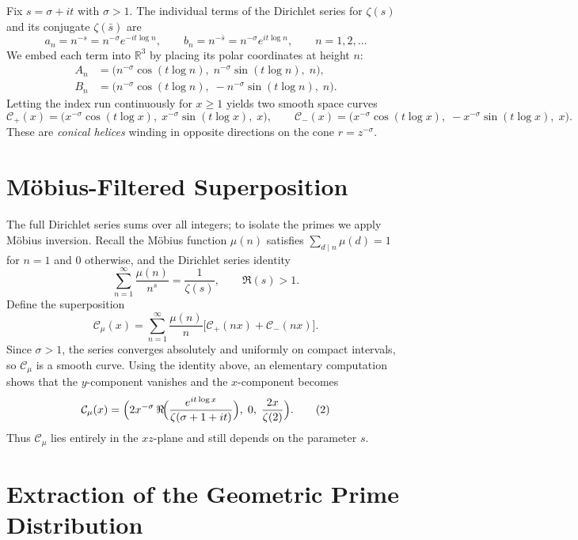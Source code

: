 \documentclass[12pt,a4paper,oneside]{book}
\newcommand{\R}{\mathbb{R}}
\begin{document}
Fix \(s=\sigma+it\) with \(\sigma>1\).  The individual terms of the Dirichlet series for \(\zeta(s)\) and its conjugate \(\zeta(\bar s)\) are
\[
a_n = n^{-s} = n^{-\sigma} e^{-i t \log n},\qquad
b_n = n^{-\bar s} = n^{-\sigma} e^{i t \log n},\qquad n=1,2,\dots
\]
We embed each term into \(\R^3\) by placing its polar coordinates at height \(n\):
\begin{align*}
A_n &= \bigl( n^{-\sigma}\cos(t\log n),\; n^{-\sigma}\sin(t\log n),\; n \bigr),\\
B_n &= \bigl( n^{-\sigma}\cos(t\log n),\; -n^{-\sigma}\sin(t\log n),\; n \bigr).
\end{align*}
Letting the index run continuously for \(x\ge 1\) yields two smooth space curves
\begin{equation}\label{conical}
\mathcal{C}_+(x) = \bigl( x^{-\sigma}\cos(t\log x),\; x^{-\sigma}\sin(t\log x),\; x \bigr),\qquad
\mathcal{C}_-(x) = \bigl( x^{-\sigma}\cos(t\log x),\; -x^{-\sigma}\sin(t\log x),\; x \bigr).
\end{equation}
These are \emph{conical helices} winding in opposite directions on the cone \(r = z^{-\sigma}\).

\section{Möbius-Filtered Superposition}

The full Dirichlet series sums over all integers; to isolate the primes we apply Möbius inversion.  Recall the Möbius function \(\mu(n)\) satisfies \(\sum_{d\mid n}\mu(d)=1\) for \(n=1\) and \(0\) otherwise, and the Dirichlet series identity
\[
\sum_{n=1}^{\infty} \frac{\mu(n)}{n^s} = \frac{1}{\zeta(s)},\qquad \Re(s)>1.
\]
Define the superposition
\[
\mathcal{C}_\mu(x) = \sum_{n=1}^{\infty} \frac{\mu(n)}{n} \bigl[ \mathcal{C}_+(n x) + \mathcal{C}_-(n x) \bigr].
\]
Since \(\sigma>1\), the series converges absolutely and uniformly on compact intervals, so \(\mathcal{C}_\mu\) is a smooth curve.  Using the identity above, an elementary computation shows that the \(y\)-component vanishes and the \(x\)-component becomes
\[
\mathcal{C}_\mu(x) = \Bigl( 2x^{-\sigma}\,\Re\!\Bigl( \frac{e^{it\log x}}{\zeta(\sigma+1+it)} \Bigr),\; 0,\; \frac{2x}{\zeta(2)} \Bigr).
\tag{2}
\]
Thus \(\mathcal{C}_\mu\) lies entirely in the \(xz\)-plane and still depends on the parameter \(s\).

\section{Extraction of the Geometric Prime Distribution}
\end{document}

